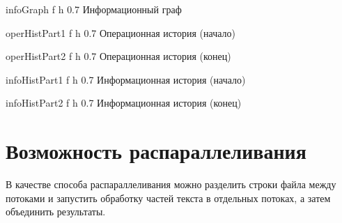 {infoGraph} %
{f} %
{h} %
{0.7\textwidth} %
{Информационный граф} %

{operHistPart1} %
{f} %
{h} %
{0.7\textwidth} %
{Операционная история (начало)} %

{operHistPart2} %
{f} %
{h} %
{0.7\textwidth} %
{Операционная история (конец)} %

{infoHistPart1} %
{f} %
{h} %
{0.7\textwidth} %
{Информационная история (начало)} %

{infoHistPart2} %
{f} %
{h} %
{0.7\textwidth} %
{Информационная история (конец)} %

\clearpage

\section{Возможность распараллеливания}

В качестве способа распараллеливания можно разделить строки файла между потоками и запустить обработку частей текста в отдельных потоках, а затем объединить результаты.
